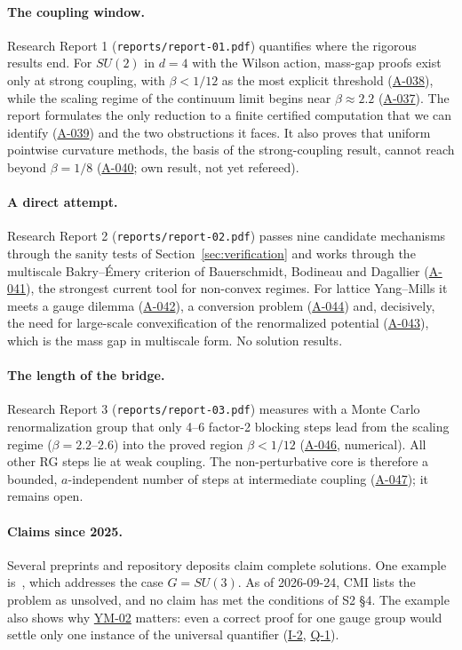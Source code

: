 \documentclass[11pt,a4paper]{article}
\newcommand{\idref}[1]{\hyperref[#1]{\textsf{#1}}}
\begin{document}
\paragraph{The coupling window.} Research Report 1 (\texttt{reports/report-01.pdf}) quantifies where the rigorous results end. For $SU(2)$ in $d=4$ with the Wilson action, mass-gap proofs exist only at strong coupling, with $\beta<1/12$ as the most explicit threshold (\idref{A-038}), while the scaling regime of the continuum limit begins near $\beta\approx2.2$ (\idref{A-037}). The report formulates the only reduction to a finite certified computation that we can identify (\idref{A-039}) and the two obstructions it faces. It also proves that uniform pointwise curvature methods, the basis of the strong-coupling result, cannot reach beyond $\beta=1/8$ (\idref{A-040}; own result, not yet refereed).

\paragraph{A direct attempt.} Research Report 2 (\texttt{reports/report-02.pdf}) passes nine candidate mechanisms through the sanity tests of Section~\ref{sec:verification} and works through the multiscale Bakry--Émery criterion of Bauerschmidt, Bodineau and Dagallier (\idref{A-041}), the strongest current tool for non-convex regimes. For lattice Yang--Mills it meets a gauge dilemma (\idref{A-042}), a conversion problem (\idref{A-044}) and, decisively, the need for large-scale convexification of the renormalized potential (\idref{A-043}), which is the mass gap in multiscale form. No solution results.

\paragraph{The length of the bridge.} Research Report 3 (\texttt{reports/report-03.pdf}) measures with a Monte Carlo renormalization group that only 4--6 factor-2 blocking steps lead from the scaling regime ($\beta=2.2$--$2.6$) into the proved region $\beta<1/12$ (\idref{A-046}, numerical). All other RG steps lie at weak coupling. The non-perturbative core is therefore a bounded, $a$-independent number of steps at intermediate coupling (\idref{A-047}); it remains open.

\paragraph{Claims since 2025.} Several preprints and repository deposits claim complete solutions. One example is~\cite{Jac25}, which addresses the case $G=SU(3)$. As of 2026-09-24, CMI lists the problem as unsolved, and no claim has met the conditions of S2 \S4. The example also shows why \idref{YM-02} matters: even a correct proof for one gauge group would settle only one instance of the universal quantifier (\idref{I-2}, \idref{Q-1}).
\end{document}
